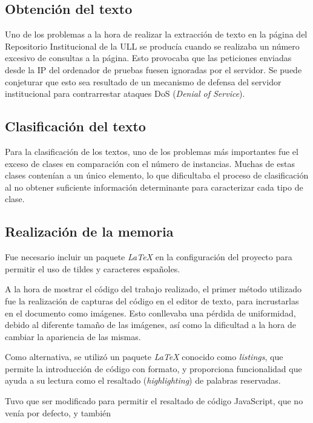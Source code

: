 \lhead{\emph{\ChapterFour{}}}

\subsection{Obtención del texto}

Uno de los problemas a la hora de realizar la extracción de texto en la página del Repositorio Institucional de la ULL se producía cuando se realizaba un número excesivo de consultas a la página. Esto provocaba que las peticiones enviadas desde la IP del ordenador de pruebas fuesen ignoradas por el servidor. Se puede conjeturar que esto sea resultado de un mecanismo de defensa del servidor institucional para contrarrestar ataques DoS (\textit{Denial of Service}). 

\subsection{Clasificación del texto}

Para la clasificación de los textos, uno de los problemas más importantes fue el exceso de clases en comparación con el número de instancias. Muchas de estas clases contenían a un único elemento, lo que dificultaba el proceso de clasificación al no obtener suficiente información determinante para caracterizar cada tipo de clase.

\subsection{Realización de la memoria}

Fue necesario incluir un paquete \textit{LaTeX} en la configuración del proyecto para permitir el uso de tildes y caracteres españoles.

A la hora de mostrar el código del trabajo realizado, el primer método utilizado fue la realización de capturas del código en el editor de texto, para incrustarlas en el documento como imágenes.
Esto conllevaba una pérdida de uniformidad, debido al diferente tamaño de las imágenes, así como la dificultad a la hora de cambiar la apariencia de las mismas.

Como alternativa, se utilizó un paquete \textit{LaTeX} conocido como \textit{listings}, que permite la introducción de código con formato, y proporciona funcionalidad que ayuda a su lectura como el resaltado (\textit{highlighting}) de palabras reservadas.

Tuvo que ser modificado para permitir el resaltado de código JavaScript, que no venía por defecto, y también 